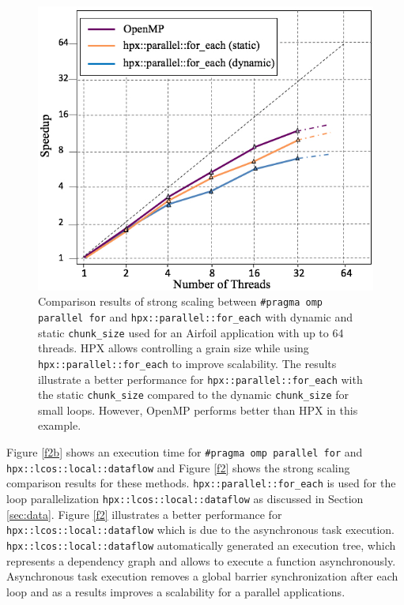 \documentclass[conference]{IEEEtran}
\begin{document}
\begin{figure} 
\begin{center}
\centering
\includegraphics[width=1\columnwidth]{Pictures/parallel_for_each.jpg}
\caption {\small{Comparison results of strong scaling between \texttt{\#pragma omp parallel for} and \texttt{hpx::parallel::for\_each} with dynamic and static \texttt{chunk\_size} used for an Airfoil application
with up to 64 threads. HPX allows controlling a grain size while using \texttt{hpx::parallel::for\_each} to improve scalability. The results illustrate a better performance for \texttt{hpx::parallel::for\_each} with the static \texttt{chunk\_size} compared to the dynamic \texttt{chunk\_size} for small loops. However, OpenMP performs better than HPX in this example.}}
\label{f1}
\end{center}
\end{figure}




Figure \ref{f2b} shows an execution time for \texttt{\#pragma omp parallel for} and \texttt{hpx::lcos::local::dataflow} and Figure \ref{f2} shows the strong scaling comparison results for these methods. \texttt{hpx::parallel::for\_each} is used for the loop parallelization \texttt{hpx::lcos::local::dataflow} as discussed in Section \ref{sec:data}. Figure \ref{f2} illustrates a better performance for \texttt{hpx::lcos::local::dataflow} which is due to the asynchronous task execution. \texttt{hpx::lcos::local::dataflow} automatically generated an execution tree, which represents a dependency graph and allows to execute a function asynchronously. Asynchronous task execution removes a global barrier synchronization after each loop and as a results improves a scalability for a parallel applications.    
\end{document}
